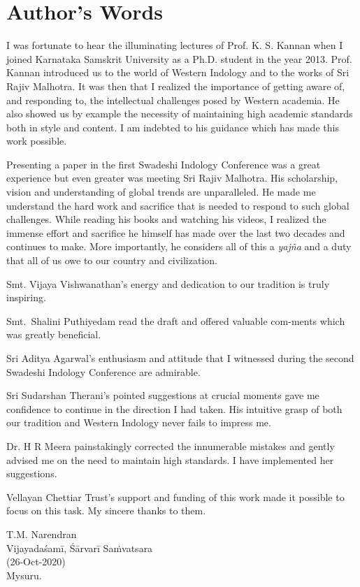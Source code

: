 
\chapter*{Author’s Words}\label{authorswords}

I was fortunate to hear the illuminating lectures of Prof. K. S. Kannan when I joined Karnataka Samskrit University as a Ph.D. student in the year 2013. Prof. Kannan introduced us to the world of Western Indology and to the works of Sri Rajiv Malhotra. It was then that I realized the importance of getting aware of, and responding to, the intellectual challenges posed by Western academia. He also showed us by example the necessity of maintaining high academic standards both in style and content. I am indebted to his guidance which has made this work possible.

Presenting a paper in the first Swadeshi Indology Conference was a great experience but even greater was meeting Sri Rajiv Malhotra. His scholarship, vision and understanding of global trends are unparalleled. He made me understand the hard work and sacrifice that is needed to respond to such global challenges. While reading his books and watching his videos, I realized the immense effort and sacrifice he himself has made over the last two decades and continues to make. More importantly, he considers all of this a \textit{yajña} and a duty that all of us owe to our country and civilization.

Smt. Vijaya Vishwanathan’s energy and dedication to our tradition is truly inspiring.

Smt.~Shalini Puthiyedam read the draft and offered valuable com-\break ments which was greatly beneficial.

Sri Aditya Agarwal’s enthusiasm and attitude that I witnessed during the second Swadeshi Indology Conference are admirable.

Sri Sudarshan Therani’s pointed suggestions at crucial moments gave me confidence to continue in the direction I had taken. His intuitive grasp of both our tradition and Western Indology never fails to impress me.

Dr. H R Meera painstakingly corrected the innumerable mistakes and gently advised me on the need to maintain high standards. I have implemented her suggestions.

Vellayan Chettiar Trust’s support and funding of this work made it possible to focus on this task. My sincere thanks to them.

\begin{flushright}
T.M. Narendran\\ Vijayadaśamī, Śārvarī Saṁvatsara\\(26-Oct-2020)\\ Mysuru.
\end{flushright}


